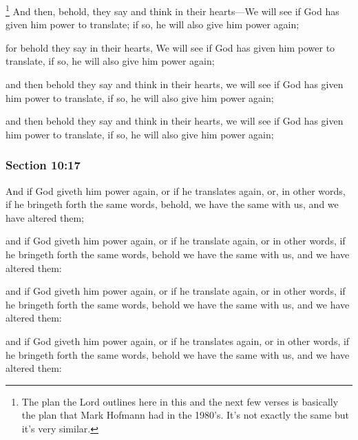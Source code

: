 			\footnote{%
				The plan the Lord outlines here in this and the next few verses is basically the plan that Mark Hofmann had in the 1980's. It's not exactly the same but it's very similar.
				}%
		And then, behold, they say and think in their hearts---We will see if God has given him power to translate; if so, he will also give him power again;

		\begin{framed}
		\scriptsize
			\begin{compactdesc}
				\item[JSP] for behold they say in their hearts, We will see if God has given him power to translate, if so, he will also give him power again;
				\item[RB1] [\textit{missing}] 
				\item[DC 1835] and then behold they say and think in their hearts, we will see if God has given him power to translate, if so, he will also give him power again;
				\item[DC 1844] and then behold they say and think in their hearts, we will see if God has given him power to translate, if so, he will also give him power again; 
			\end{compactdesc}
		\end{framed}

	\subsubsection{Section 10:17} %
		\label{DC10-17}

		And if God giveth him power again, or if he translates again, or, in other words, if he bringeth forth the same words, behold, we have the same with us, and we have altered them;

		\begin{framed}
		\scriptsize
			\begin{compactdesc}
				\item[JSP] and if God giveth him power again, or if he translate again, or in other words, if he bringeth forth the same words, behold we have the same with us, and we have altered them:
				\item[RB1] [\textit{missing}] 
				\item[DC 1835] and if God giveth him power again, or if he translate again, or in other words, if he bringeth forth the same words, behold we have the same with us, and we have altered them: 
				\item[DC 1844] and if God giveth him power again, or if he translates again, or in other words, if he bringeth forth the same words, behold we have the same with us, and we have altered them: 
			\end{compactdesc}
		\end{framed}

